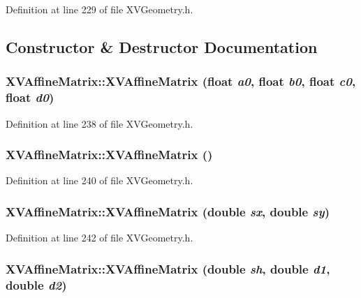 Definition at line 229 of file XVGeometry.h.

\subsection{Constructor \& Destructor Documentation}
\label{XVAffineMatrix_a0}
\hypertarget{class_XVAffineMatrix_a0}{
\subsubsection[XVAffineMatrix]{\setlength{\rightskip}{0pt plus 5cm}XVAffine\-Matrix::XVAffine\-Matrix (float {\em a0}, float {\em b0}, float {\em c0}, float {\em d0})}}




Definition at line 238 of file XVGeometry.h.\label{XVAffineMatrix_a1}
\hypertarget{class_XVAffineMatrix_a1}{
\subsubsection[XVAffineMatrix]{\setlength{\rightskip}{0pt plus 5cm}XVAffine\-Matrix::XVAffine\-Matrix ()}}




Definition at line 240 of file XVGeometry.h.\label{XVAffineMatrix_a3}
\hypertarget{class_XVAffineMatrix_a3}{
\subsubsection[XVAffineMatrix]{\setlength{\rightskip}{0pt plus 5cm}XVAffine\-Matrix::XVAffine\-Matrix (double {\em sx}, double {\em sy})}}




Definition at line 242 of file XVGeometry.h.\label{XVAffineMatrix_a4}
\hypertarget{class_XVAffineMatrix_a4}{
\subsubsection[XVAffineMatrix]{\setlength{\rightskip}{0pt plus 5cm}XVAffine\-Matrix::XVAffine\-Matrix (double {\em sh}, double {\em d1}, double {\em d2})}}




